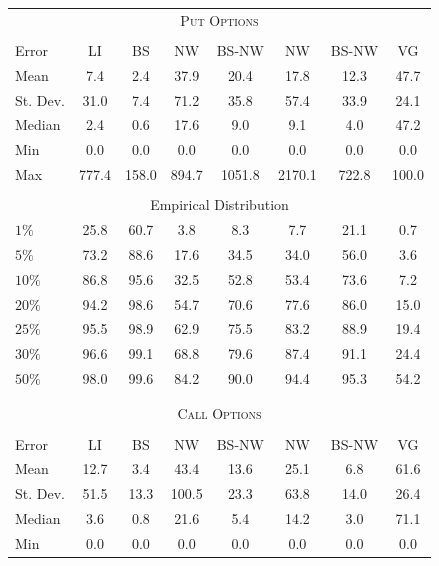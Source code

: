 \begin{center} 
 \begin{tabular*}{\textwidth}{@{\extracolsep{\fill}}lccccccc} 
 \toprule 
 \multicolumn{8}{c}{\textsc{Put Options}}\\ 
 \multicolumn{8}{c}{}\\ 
Error & LI & BS& NW & BS-NW & NW\raisebox{-.4ex}{\tiny CV} & BS-NW\raisebox{-.4ex}{\tiny CV} & VG \\  
 \midrule 
Mean       & 7.4& 2.4& 37.9& 20.4& 17.8& 12.3& 47.7\\ 
St. Dev.   & 31.0& 7.4& 71.2& 35.8& 57.4& 33.9& 24.1\\ 
Median     & 2.4& 0.6& 17.6& 9.0& 9.1& 4.0& 47.2\\ 
Min        & 0.0& 0.0& 0.0& 0.0& 0.0& 0.0& 0.0\\ 
Max        & 777.4& 158.0& 894.7& 1051.8& 2170.1& 722.8& 100.0\\ 
 \multicolumn{8}{c}{}\\ 
 \multicolumn{8}{c}{Empirical Distribution}\\ 
 \midrule 
$1\%$      & 25.8& 60.7& 3.8& 8.3& 7.7& 21.1& 0.7\\ 
$5\%$      & 73.2& 88.6& 17.6& 34.5& 34.0& 56.0& 3.6\\ 
$10\%$     & 86.8& 95.6& 32.5& 52.8& 53.4& 73.6& 7.2\\ 
$20\%$     & 94.2& 98.6& 54.7& 70.6& 77.6& 86.0& 15.0\\ 
$25\%$     & 95.5& 98.9& 62.9& 75.5& 83.2& 88.9& 19.4\\ 
$30\%$     & 96.6& 99.1& 68.8& 79.6& 87.4& 91.1& 24.4\\ 
$50\%$     & 98.0& 99.6& 84.2& 90.0& 94.4& 95.3& 54.2\\ 
 \multicolumn{8}{c}{}\\ 
 \multicolumn{8}{c}{}\\ 
 \toprule 
 \multicolumn{8}{c}{\textsc{Call Options}}\\ 
 \multicolumn{8}{c}{}\\ 
Error & LI & BS& NW & BS-NW & NW\raisebox{-.4ex}{\tiny CV} & BS-NW\raisebox{-.4ex}{\tiny CV} & VG \\  
 \midrule 
Mean       & 12.7& 3.4& 43.4& 13.6& 25.1& 6.8& 61.6\\ 
St. Dev.   & 51.5& 13.3& 100.5& 23.3& 63.8& 14.0& 26.4\\ 
Median     & 3.6& 0.8& 21.6& 5.4& 14.2& 3.0& 71.1\\ 
Min        & 0.0& 0.0& 0.0& 0.0& 0.0& 0.0& 0.0\\ 

\end{tabular*}
\end{center}
